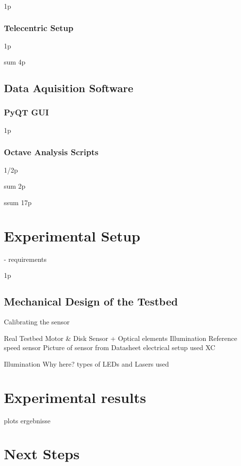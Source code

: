 \documentclass[12pt,a4paper]{article}
\begin{document}
1p

\subsubsection{Telecentric Setup}

1p

sum 4p

\subsection{Data Aquisition Software}

\subsubsection{PyQT GUI}
1p

\subsubsection{Octave Analysis Scripts}
1/2p


sum 2p

ssum 17p

\section{Experimental Setup}

- requirements

1p

\subsection{Mechanical Design of the Testbed}



  Calibrating the sensor

  Real Testbed
    Motor & Disk
    Sensor + Optical elements
    Illumination
    Reference speed sensor
      Picture of sensor from Datasheet
      electrical setup used
    XC

  Illumination
    Why here?
    types of LEDs and Lasers used

\section{Experimental results}

  plots
  ergebnisse

\section{Next Steps}
\end{document}
